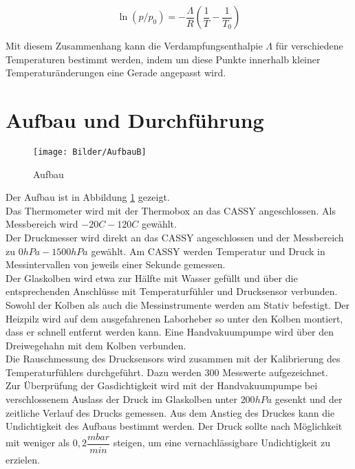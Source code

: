 \documentclass[12pt,a4paper]{article}
\begin{document}
\begin{equation}
\ln{(p/p_0)}=-\frac{\Lambda}{R} \left(\frac{1}{T}-			\frac{1}{T_0}\right)
\end{equation}

Mit diesem Zusammenhang kann die Verdampfungsenthalpie $\Lambda$ für verschiedene Temperaturen bestimmt werden, indem um diese Punkte innerhalb kleiner Temperaturänderungen eine Gerade angepasst wird.

\section{Aufbau und Durchführung}
\begin{figure}
\texttt{[image: Bilder/AufbauB]}
\caption[AufbauB]{Aufbau}
\label{fig:AufbauB}
\end{figure}

Der Aufbau ist in Abbildung \ref{fig:AufbauB} gezeigt. \\
Das Thermometer wird mit der Thermobox an das CASSY angeschlossen. Als Messbereich wird $-20C - 120C$ gewählt.\\
Der Druckmesser wird direkt an das CASSY angeschlossen und der Messbereich zu $0hPa - 1500hPa$ gewählt. Am CASSY werden Temperatur und Druck in Messintervallen von jeweils einer Sekunde gemessen. \\

Der Glaskolben wird etwa zur Hälfte mit Wasser gefüllt und über die entsprechenden Anschlüsse mit Temperaturfühler und Drucksensor verbunden. Sowohl der Kolben als auch die Messinstrumente werden am Stativ befestigt. Der Heizpilz wird auf dem ausgefahrenen Laborheber so unter den Kolben montiert, dass er schnell entfernt werden kann. Eine Handvakuumpumpe wird über den Dreiwegehahn mit dem Kolben verbunden.\\

Die Rauschmessung des Drucksensors wird zusammen mit der Kalibrierung des Temperaturfühlers durchgeführt. Dazu werden $300$ Messwerte aufgezeichnet.\\
Zur Überprüfung der Gasdichtigkeit wird mit der Handvakuumpumpe bei verschlossenem Auslass der Druck im Glaskolben unter $200hPa$ gesenkt und der zeitliche Verlauf des Drucks gemessen. Aus dem Anstieg des Druckes kann die Undichtigkeit des Aufbaus bestimmt werden. Der Druck sollte nach Möglichkeit mit weniger als $0,2 \dfrac{mbar}{min}$ steigen, um eine vernachlässigbare Undichtigkeit zu erzielen. \\
\end{document}
